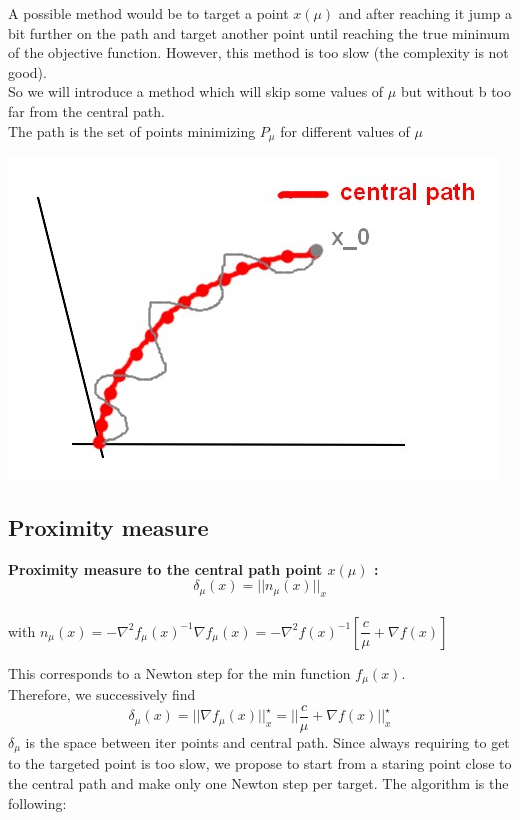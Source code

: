 A possible method would be to target a point $x(\mu)$ and after reaching it jump a bit further on the path and target another point until reaching the true minimum of the objective function. However, this method is too slow (the complexity is not good).\\
So we will introduce a method which will skip some values of $\mu$ but without b too far from the central path.\\
The path is the set of points minimizing $P_\mu$ for different values of $\mu$
\begin{center}
\includegraphics[scale=0.3]{images/12-fig2.jpg} 
\end{center}

\subsection{Proximity measure}
\begin{definition} \textbf{Proximity measure to the central path point $x(\mu)$ :}\\ $$ \delta_{\mu}(x) = || n_{\mu}(x) ||_x $$\\
 with $n_{\mu}(x) = - \nabla^2 f_{\mu}(x)^{-1} \nabla f_{\mu}(x) = - \nabla^2 f(x)^{-1} [\dfrac{c}{\mu} + \nabla f(x)]$\\
\end{definition}

 This corresponds to a Newton step for the min function $f_{\mu}(x)$.\\ Therefore, we successively find
$$\delta_{\mu}(x) = || \nabla f_{\mu}(x) ||_x^{\star} = || \dfrac{c}{\mu} + \nabla f(x) ||_x^{\star}$$
$\delta_{\mu}$ is the space between iter points and central path. Since always requiring to get to the targeted point is too slow, we propose to start from a staring point close to the central path and make only one Newton step per target. The algorithm is the following:\\

